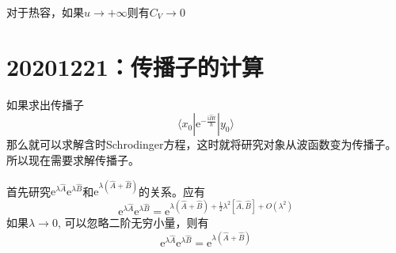 \documentclass[12pt]{article}
\begin{document}
对于热容，如果$u \to +\infty$则有$C_V \to 0$

\section{20201221：传播子的计算}

如果求出传播子
\begin{equation*}
    \langle x_0 | \mathrm{e}^{-\frac {\mathrm{i}\hat{H}t}{\hbar}} | y_0 \rangle
\end{equation*}
那么就可以求解含时Schrodinger方程，这时就将研究对象从波函数变为传播子。所以现在需要求解传播子。

首先研究$\mathrm{e}^{\lambda \hat{A}}\mathrm{e}^{\lambda \hat{B}}$和$\mathrm{e}^{\lambda (\hat{A}+\hat{B})}$的关系。应有
\begin{equation*}
    \mathrm{e}^{\lambda \hat{A}} \mathrm{e}^{\lambda \hat{B}} = \mathrm{e}^{\lambda (\hat{A}+\hat{B}) + \frac 12 \lambda^2 [\hat{A},\hat{B}] + O(\lambda^2)}
\end{equation*}
如果$\lambda \to 0$, 可以忽略二阶无穷小量，则有
\begin{equation*}
    \mathrm{e}^{\lambda \hat{A}} \mathrm{e}^{\lambda \hat{B}} = \mathrm{e}^{\lambda (\hat{A}+\hat{B})}
\end{equation*}
\end{document}
